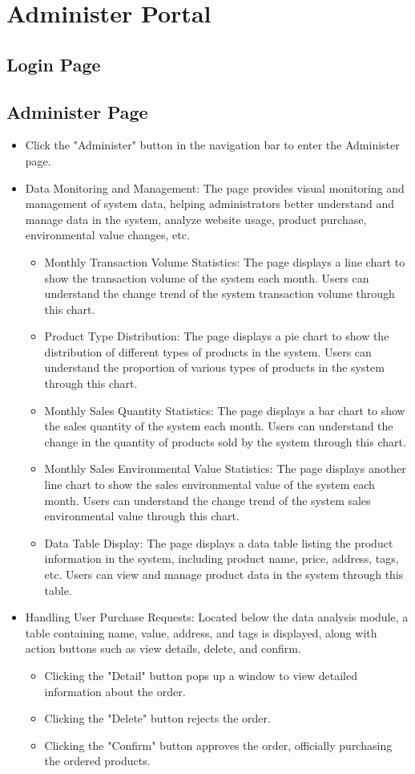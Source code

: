 \documentclass{article}
\begin{document}
\section{Administer Portal}
\subsection{Login Page}
\subsection{Administer Page}
\begin{itemize}
    \item Click the "Administer" button in the navigation bar to enter the Administer page.
    \item Data Monitoring and Management: The page provides visual monitoring and management of system data, helping administrators better understand and manage data in the system, analyze website usage, product purchase, environmental value changes, etc.
    \begin{itemize}
        \item Monthly Transaction Volume Statistics: The page displays a line chart to show the transaction volume of the system each month. Users can understand the change trend of the system transaction volume through this chart.
        \item Product Type Distribution: The page displays a pie chart to show the distribution of different types of products in the system. Users can understand the proportion of various types of products in the system through this chart.
        \item Monthly Sales Quantity Statistics: The page displays a bar chart to show the sales quantity of the system each month. Users can understand the change in the quantity of products sold by the system through this chart.
        \item Monthly Sales Environmental Value Statistics: The page displays another line chart to show the sales environmental value of the system each month. Users can understand the change trend of the system sales environmental value through this chart.
        \item Data Table Display: The page displays a data table listing the product information in the system, including product name, price, address, tags, etc. Users can view and manage product data in the system through this table.
    \end{itemize}
    \item Handling User Purchase Requests: Located below the data analysis module, a table containing name, value, address, and tags is displayed, along with action buttons such as view details, delete, and confirm.
    \begin{itemize}
        \item Clicking the "Detail" button pops up a window to view detailed information about the order.
        \item Clicking the "Delete" button rejects the order.
        \item Clicking the "Confirm" button approves the order, officially purchasing the ordered products.
    \end{itemize}
\end{itemize}
\end{document}

